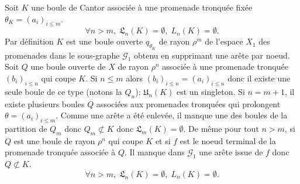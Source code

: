 \begin{exple}
Soit $K$ une boule de Cantor associée à une promenade tronquée fixée $\theta_K = (a_i)_{i\leq m}$.
\begin{displaymath}
 \forall n > m, \;  \mathfrak{L}_n(K) = \emptyset, \; L_n(K) = \emptyset.
\end{displaymath}
Par définition $K$ est une boule ouverte $q_{\theta_K}$ de rayon $\rho^m$ de l'espace $X_1$ des promenades dans le sous-graphe $\mathcal{G}_1$ obtenu en supprimant une arête par noeud.\newline
Soit $Q$ une boule ouverte de $X$ de rayon $\rho^n$ associée à une promenade tronquée $(b_i)_{i\leq n}$ qui coupe $K$.\newline
Si $n \leq m$ alors $(b_i)_{i\leq n} = (a_i)_{i\leq n}$ donc il existe une seule boule de ce type (notons la $Q_n$): $\mathfrak{U}_n(K)$ est un singleton.\newline
Si $n = m + 1$, il existe plusieurs boules $Q$ associées aux promenades tronquées qui prolongent $\theta = (a_i)_{i\leq m}$. Comme une arête a été enlevée, il manque une des boules de la partition de $Q_m$ donc $Q_m \not\subset K$ donc $\mathfrak{L}_m(K) = \emptyset$.\newline
De même pour tout $n > m$, si $Q$ est une boule de rayon $\rho^n$ qui coupe $K$ et si $f$ est le noeud terminal de la promenade tronquée associée à $Q$. Il manque dans $\mathcal{G}_1$ une arête issue de $f$ donc $Q\not\subset K$.
\begin{displaymath}
 \forall n > m, \;  \mathfrak{L}_n(K) = \emptyset, \; L_n(K) = \emptyset.
\end{displaymath}
\end{exple}

